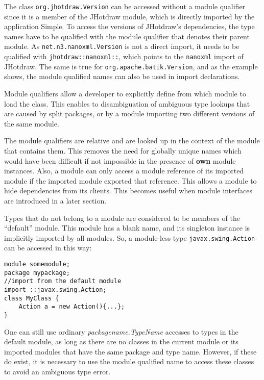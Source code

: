 The class \texttt{org.jhotdraw.Version} can be accessed without
a module qualifier since it is a member of the JHotdraw module, 
which is directly imported by the application Simple. To access
the versions of JHotdraw's dependencies, the type names have to
be qualified with the module qualifier that denotes their parent
module. As \texttt{net.n3.nanoxml.Version} is not a direct import,
it needs to be qualified with \texttt{jhotdraw::nanoxml::}, which
points to the \texttt{nanoxml} import of JHotdraw. The same is
true for \texttt{org.apache.batik.Version}, and as the example shows,
the module qualified names can also be used in import declarations.

Module qualifiers allow a developer to explicitly define from which module
to load the class. This enables to disambiguation of ambiguous type
lookups that are caused by split packages, or by a module importing
two different versions of the same module.

The module qualifiers are relative and are looked up in the context 
of the module that contains them. This removes the need for globally
unique names which would have been difficult if not impossible in the
presence of \textbf{own} module instances. Also, a module can only
access a module reference of its imported module if the imported module
exported that reference. This allows a module to hide dependencies from
its clients. This becomes useful when module interfaces are introduced
in a later section.

Types that do not belong to a module are considered to be members of
the ``default'' module. This module has a blank name, and its singleton
instance is implicitly imported by all modules. So, a module-less
type {\tt javax.swing.Action} can be accessed in this way:

\begin{lstlisting}[caption=Default Module Lookups]
module somemodule;
package mypackage;
//import from the default module
import ::javax.swing.Action;
class MyClass {
	Action a = new Action(){...};
}
\end{lstlisting}

One can still use ordinary \textit{packagename.TypeName} accesses to types in
the default module, as long as there are no classes in the current module
or its imported modules that have the same package and type name. However,
if these do exist, it is necessary to use the module qualified name to access
these classes to avoid an ambiguous type error.

